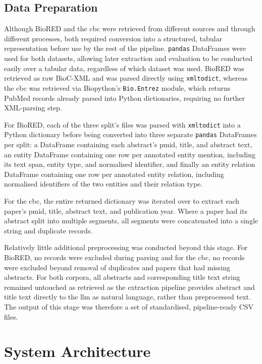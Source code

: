 \subsection{Data Preparation}
\label{subsec:meth:data_preparation}
Although BioRED and the \gls{cbc} were retrieved from different sources and through different processes, both required conversion into a structured, tabular representation before use by the rest of the pipeline. \verb|pandas| DataFrames were used for both datasets, allowing later extraction and evaluation to be conducted easily over a tabular data, regardless of which dataset was used. BioRED was retrieved as raw BioC-XML and was parsed directly using \verb|xmltodict|, whereas the \gls{cbc} was retrieved via Biopython's \verb|Bio.Entrez| module, which returns PubMed records already parsed into Python dictionaries, requiring no further XML-parsing step.

For BioRED, each of the three split's files was parsed with \verb|xmltodict| into a Python dictionary before being converted into three separate \verb|pandas| DataFrames per split: a DataFrame containing each abstract's \gls{pmid}, title, and abstract text, an entity DataFrame containing one row per annotated entity mention, including its text span, entity type, and normalised identifier, and finally an entity relation DataFrame containing one row per annotated entity relation, including normalised identifiers of the two entities and their relation type.

For the \gls{cbc}, the entire returned dictionary was iterated over to extract each paper's \gls{pmid}, title, abstract text, and publication year. Where a paper had its abstract split into multiple segments, all segments were concatenated into a single string and duplicate records.

Relatively little additional preprocessing was conducted beyond this stage. For BioRED, no records were excluded during parsing and for the \gls{cbc}, no records were excluded beyond removal of duplicates and papers that had missing abstracts. For both corpora, all abstracts and corresponding title text string remained untouched as retrieved as the extraction pipeline provides abstract and title text directly to the \gls{llm} as natural language, rather than preprocessed text. The output of this stage was therefore a set of standardised, pipeline-ready CSV files.

\section{System Architecture}
\label{sec:meth:system_architecture}

